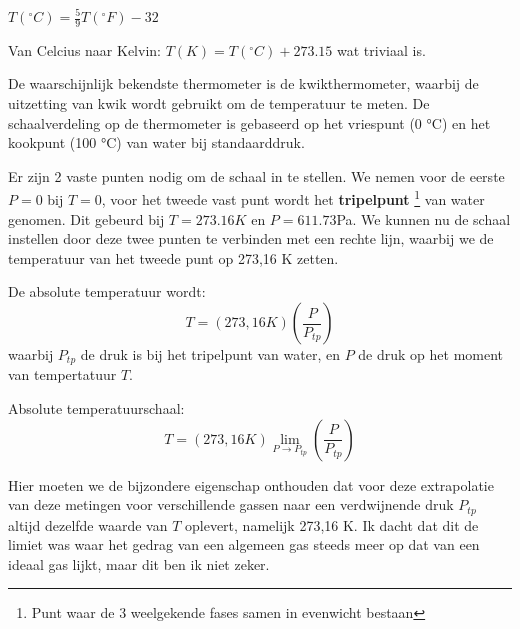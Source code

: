 \(T(^\circ C) = \frac{5}{9}T(^\circ F) - 32\)

Van Celcius naar Kelvin: \(T(K) = T(^\circ C) + 273.15\) wat triviaal is.

De waarschijnlijk bekendste thermometer is de kwikthermometer, waarbij de uitzetting van kwik wordt gebruikt om de temperatuur te meten. De schaalverdeling op de thermometer is gebaseerd op het vriespunt (0 °C) en het kookpunt (100 °C) van water bij standaarddruk.

Er zijn 2 vaste punten nodig om de schaal in te stellen. We nemen voor de eerste \(P=0\) bij \(T=0\), voor het tweede vast punt wordt het \textbf{tripelpunt} \footnote{Punt waar de 3 weelgekende fases samen in evenwicht bestaan} van water genomen. Dit gebeurd bij \(T = 273.16 K\) en \(P=611.73\)Pa.
We kunnen nu de schaal instellen door deze twee punten te verbinden met een rechte lijn, waarbij we de temperatuur van het tweede punt op 273,16 K zetten.

De absolute temperatuur wordt:
\[
T = (273,16 K)\left( \frac{P}{P_{tp}} \right)
\]
waarbij \(P_{tp}\) de druk is bij het tripelpunt van water, en \(P\) de druk op het moment van tempertatuur \(T\).

Absolute temperatuurschaal:
\[
T =(273,16 K) \lim_{P \to P_{tp}} \left( \frac{P}{P_{tp}} \right)
\]

Hier moeten we de bijzondere eigenschap onthouden dat voor deze extrapolatie van deze metingen voor verschillende gassen naar een verdwijnende druk \(P_{tp}\) altijd dezelfde waarde van \(T\) oplevert, namelijk 273,16 K.
Ik dacht dat dit de limiet was waar het gedrag van een algemeen gas steeds meer op dat van een ideaal gas lijkt, maar dit ben ik niet zeker.
